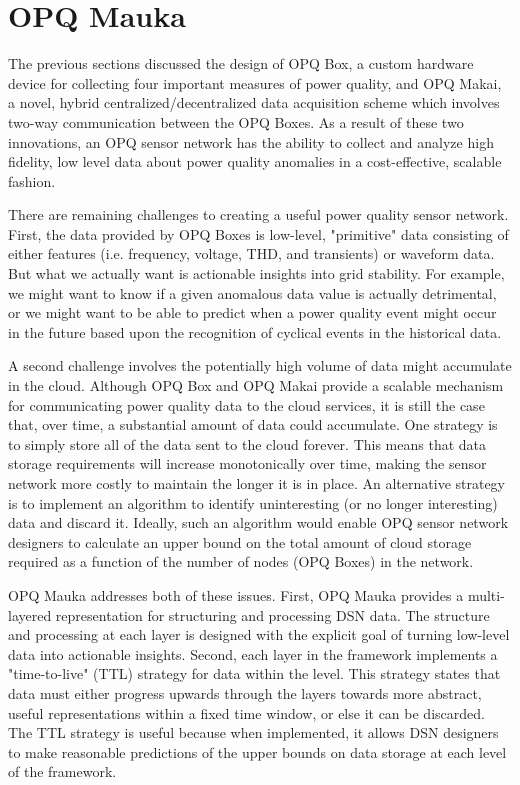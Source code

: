\section{OPQ Mauka}
\label{sec:opq-mauka}

The previous sections discussed the design of OPQ Box, a custom hardware device for collecting four important measures of power quality, and OPQ Makai, a novel, hybrid centralized/decentralized data acquisition scheme which involves two-way communication between the OPQ Boxes.  As a result of these two innovations, an OPQ sensor network has the ability to collect and analyze high fidelity, low level data about power quality anomalies in a cost-effective, scalable fashion.

There are remaining challenges to creating a useful power quality sensor network. First, the data provided by OPQ Boxes is low-level, "primitive" data consisting of either features (i.e. frequency, voltage, THD, and transients) or waveform data. But what we actually want is actionable insights into grid stability. For example, we might want to know if a given anomalous data value is actually detrimental, or we might want to be able to predict when a power quality event might occur in the future based upon the recognition of cyclical events in the historical data.

A second challenge involves the potentially high volume of data might accumulate in the cloud. Although OPQ Box and OPQ Makai provide a scalable mechanism for communicating power quality data to the cloud services, it is still the case that, over time, a substantial amount of data could accumulate. One strategy is to simply store all of the data sent to the cloud forever. This means that data storage requirements will increase monotonically over time, making the sensor network more costly to maintain the longer it is in place. An alternative strategy is to implement an algorithm to identify uninteresting (or no longer interesting) data and discard it.  Ideally, such an algorithm would enable OPQ sensor network designers to calculate an upper bound on the total amount of cloud storage required as a function of the number of nodes (OPQ Boxes) in the network.

OPQ Mauka addresses both of these issues. First, OPQ Mauka provides a multi-layered representation for structuring and processing DSN data. The structure and processing at each layer is designed with the explicit goal of turning low-level data into actionable insights. Second, each layer in the framework implements a "time-to-live" (TTL) strategy for data within the level. This strategy states that data must either progress upwards through the layers towards more abstract, useful representations within a fixed time window, or else it can be discarded. The TTL strategy is useful because when implemented, it allows DSN designers to make reasonable predictions of the upper bounds on data storage at each level of the framework.

